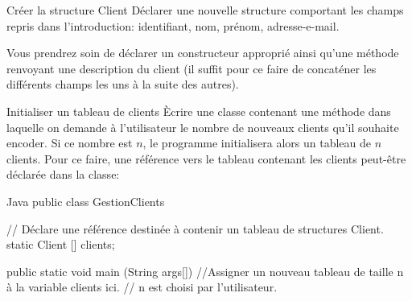 \documentclass[a4paper,11pt]{article}
\begin{document}
			

\vspace{0.3cm}







 	\begin{Exercice}{Créer la structure Client}
		D\'eclarer une nouvelle structure  comportant les champs repris dans l'introduction: identifiant, nom, prénom, adresse-e-mail.
		
		Vous prendrez soin de d\'eclarer un constructeur appropri\'e ainsi qu'une m\'ethode  renvoyant une description du client (il suffit pour ce faire de concat\'ener les diff\'erents champs les uns \`a la suite des autres).
		
	\end{Exercice} 

 
 	\begin{Exercice}{Initialiser un tableau de clients}
		 \`Ecrire une classe  contenant une m\'ethode  dans laquelle on demande \`a l'utilisateur le nombre de nouveaux clients qu'il souhaite encoder. Si ce nombre est $n$, le programme initialisera alors un tableau de $n$ clients. Pour ce faire, une référence vers le tableau contenant les clients peut-être déclarée dans la classe:\newpage
		 
		
		\begin{Code}{Java} 
			public class GestionClients
			{
				// Déclare une référence destinée à contenir un tableau de structures Client.
				static Client [] clients;
				
				public static void main (String args[])
				{
					//Assigner un nouveau tableau de taille n à la variable clients ici.
					// n est choisi par l'utilisateur.
				}
			}
		\end{Code}
			
	\end{Exercice}
\end{document}
